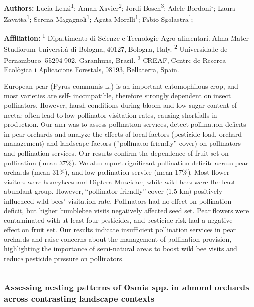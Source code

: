 \documentclass[
  letterpaper,
  DIV=11,
  numbers=noendperiod]{scrartcl}
\begin{document}
\textbf{Authors:} Lucia Lenzi\textsuperscript{1}; Arnan
Xavier\textsuperscript{2}; Jordi Bosch\textsuperscript{3}; Adele
Bordoni\textsuperscript{1}; Laura Zavatta\textsuperscript{1}; Serena
Magagnoli\textsuperscript{1}; Agata Morelli\textsuperscript{1}; Fabio
Sgolastra\textsuperscript{1};

\textbf{Affiliation:} \textsuperscript{1} Dipartimento di Scienze e
Tecnologie Agro-alimentari, Alma Mater Studiorum Università di Bologna,
40127, Bologna, Italy. \textsuperscript{2} Universidade de Pernambuco,
55294‑902, Garanhuns, Brazil. \textsuperscript{3} CREAF, Centre de
Recerca Ecològica i Aplicacions Forestals, 08193, Bellaterra, Spain.

European pear (Pyrus communis L.) is an important entomophilous crop,
and most varieties are self- incompatible, therefore strongly dependent
on insect pollinators. However, harsh conditions during bloom and low
sugar content of nectar often lead to low pollinator visitation rates,
causing shortfalls in production. Our aim was to assess pollination
services, detect pollination deficits in pear orchards and analyze the
effects of local factors (pesticide load, orchard management) and
landscape factors (``pollinator-friendly'' cover) on pollinators and
pollination services. Our results confirm the dependence of fruit set on
pollination (mean 37\%). We also report significant pollination deficits
across pear orchards (mean 31\%), and low pollination service (mean
17\%). Most flower visitors were honeybees and Diptera Muscidae, while
wild bees were the least abundant group. However,
``pollinator-friendly'' cover (1.5 km) positively influenced wild bees'
visitation rate. Pollinators had no effect on pollination deficit, but
higher bumblebee visits negatively affected seed set. Pear flowers were
contaminated with at least four pesticides, and pesticide risk had a
negative effect on fruit set. Our results indicate insufficient
pollination services in pear orchards and raise concerns about the
management of pollination provision, highlighting the importance of
semi-natural areas to boost wild bee visits and reduce pesticide
pressure on pollinators.

\begin{center}\rule{0.5\linewidth}{0.5pt}\end{center}

\subsubsection{Assessing nesting patterns of Osmia spp. in almond
orchards across contrasting landscape
contexts}\label{assessing-nesting-patterns-of-osmia-spp.-in-almond-orchards-across-contrasting-landscape-contexts}
\end{document}
